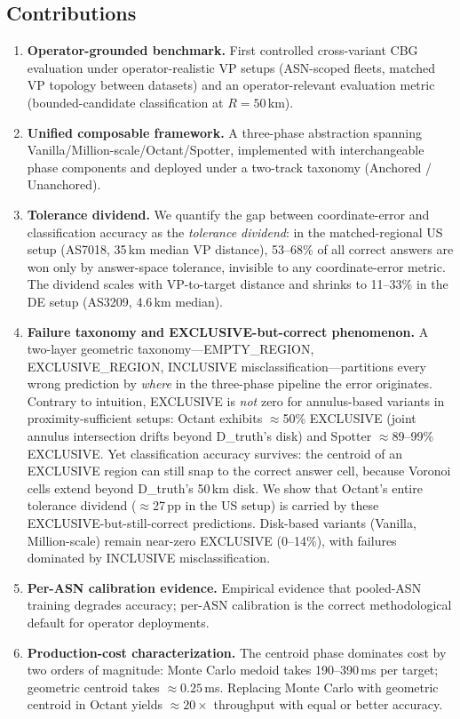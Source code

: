 \subsection{Contributions}
\label{sec:intro-contributions}

\begin{enumerate}[leftmargin=*]
  \item \textbf{Operator-grounded benchmark.} First controlled cross-variant CBG evaluation
    under operator-realistic VP setups (ASN-scoped fleets, matched VP topology between datasets)
    and an operator-relevant evaluation metric (bounded-candidate classification at $R = 50$\,km).

  \item \textbf{Unified composable framework.} A three-phase abstraction spanning
    Vanilla/Million-scale/Octant/Spotter, implemented with interchangeable phase components
    and deployed under a two-track taxonomy (Anchored / Unanchored).

  \item \textbf{Tolerance dividend.} We quantify the gap between coordinate-error and
    classification accuracy as the \emph{tolerance dividend}: in the matched-regional US setup
    (AS7018, 35\,km median VP distance), 53--68\% of all correct answers are won only by
    answer-space tolerance, invisible to any coordinate-error metric. The dividend scales with
    VP-to-target distance and shrinks to 11--33\% in the DE setup (AS3209, 4.6\,km median).

  \item \textbf{Failure taxonomy and EXCLUSIVE-but-correct phenomenon.}
    A two-layer geometric taxonomy---EMPTY\_REGION, EXCLUSIVE\_REGION, INCLUSIVE
    misclassification---partitions every wrong prediction by \emph{where} in the three-phase
    pipeline the error originates. Contrary to intuition, EXCLUSIVE is \emph{not} zero for
    annulus-based variants in proximity-sufficient setups: Octant exhibits $\approx$50\%
    EXCLUSIVE (joint annulus intersection drifts beyond D\_truth's disk) and Spotter $\approx$89--99\%
    EXCLUSIVE. Yet classification accuracy survives: the centroid of an EXCLUSIVE region can still
    snap to the correct answer cell, because Voronoi cells extend beyond D\_truth's 50\,km disk.
    We show that Octant's entire tolerance dividend ($\approx$27\,pp in the US setup) is carried by
    these EXCLUSIVE-but-still-correct predictions. Disk-based variants (Vanilla, Million-scale)
    remain near-zero EXCLUSIVE (0--14\%), with failures dominated by INCLUSIVE misclassification.

  \item \textbf{Per-ASN calibration evidence.} Empirical evidence that pooled-ASN training
    degrades accuracy; per-ASN calibration is the correct methodological default for operator
    deployments.

  \item \textbf{Production-cost characterization.} The centroid phase dominates cost by two
    orders of magnitude: Monte Carlo medoid takes 190--390\,ms per target; geometric centroid
    takes $\approx 0.25$\,ms. Replacing Monte Carlo with geometric centroid in Octant yields
    $\approx 20\times$ throughput with equal or better accuracy.
\end{enumerate}
